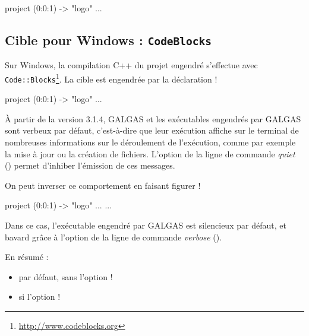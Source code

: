 \begin{galgas4}
project (0:0:1) -> "logo" {
  ...
}
\end{galgas4}



\subsection{Cible pour Windows : \texttt{CodeBlocks}}

Sur Windows, la compilation C++ du projet engendré s'effectue avec \texttt{Code{}::Blocks}\footnote{\url{http://www.codeblocks.org}}. La cible est engendrée par la déclaration \ggsq!%

\begin{galgas4}
project (0:0:1) -> "logo" {
  ...
}
\end{galgas4}






À partir de la version 3.1.4, GALGAS et les exécutables engendrés par GALGAS sont verbeux par défaut, c'est-à-dire que leur exécution affiche sur le terminal de nombreuses informations sur le déroulement de l'exécution, comme par exemple la mise à jour ou la création de fichiers. L'option de la ligne de commande \emph{quiet} () permet d'inhiber l'émission de ces messages.

On peut inverser ce comportement en faisant figurer \ggsq!%
\begin{galgas4}
project (0:0:1) -> "logo" {
  ...
  ...
}
\end{galgas4}

 Dans ce cas, l'exécutable engendré par GALGAS est silencieux par défaut, et bavard grâce à l'option de la ligne de commande \emph{verbose} ().

En résumé :
\begin{itemize}
\item par défaut, sans l'option \ggsq!%
\item si l'option \ggsq!%
\end{itemize}

